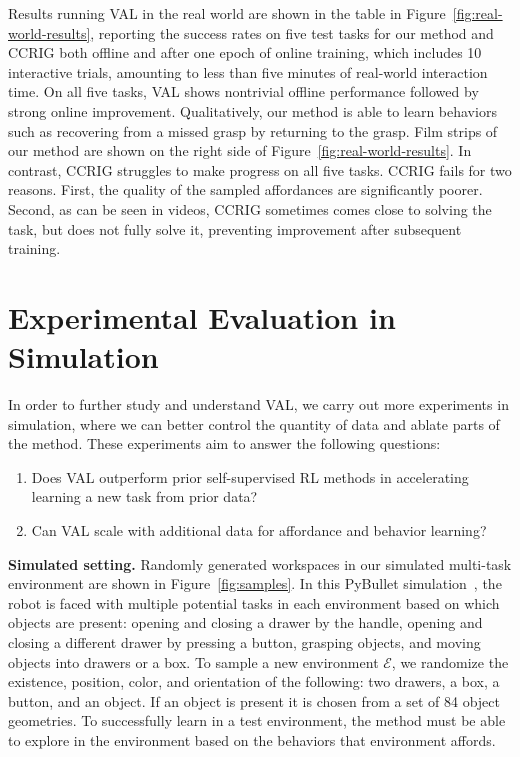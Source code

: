 \documentclass[letterpaper, 10 pt, conference]{ieeeconf}  %
\begin{document}




Results running VAL in the real world are shown in the table in Figure~\ref{fig:real-world-results}, reporting the success rates on five test tasks for our method and CCRIG both offline and after one epoch of online training, which includes 10 interactive trials, amounting to less than five minutes of real-world interaction time. On all five tasks, VAL shows nontrivial offline performance followed by strong online improvement. Qualitatively, our method is able to learn behaviors such as recovering from a missed grasp by returning to the grasp. Film strips of our method are shown on the right side of Figure~\ref{fig:real-world-results}. In contrast, CCRIG struggles to make progress on all five tasks. CCRIG fails for two reasons. First, the quality of the sampled affordances are significantly poorer. Second, as can be seen in videos, CCRIG sometimes comes close to solving the task, but does not fully solve it, preventing improvement after subsequent training.

\section{Experimental Evaluation in Simulation}

In order to further study and understand VAL, we carry out more experiments in simulation, where we can better control the quantity of data and ablate parts of the method. These experiments aim to answer the following questions:
\begin{enumerate}
    \item Does VAL outperform prior self-supervised RL methods in accelerating learning a new task from prior data?
    \item Can VAL scale with additional data for affordance and behavior learning?
\end{enumerate}

\textbf{Simulated setting.} Randomly generated workspaces in our simulated multi-task environment are shown in Figure~\ref{fig:samples}. In this PyBullet simulation~\cite{coumans2021}, the robot is faced with multiple potential tasks in each environment based on which objects are present: opening and closing a drawer by the handle, opening and closing a different drawer by pressing a button, grasping objects, and moving objects into drawers or a box. To sample a new environment $\mathcal{E}$, we randomize the existence, position, color, and orientation of the following: two drawers, a box, a button, and an object. If an object is present it is chosen from a set of 84 object geometries. To successfully learn in a test environment, the method must be able to explore in the environment based on the behaviors that environment affords.
\end{document}
